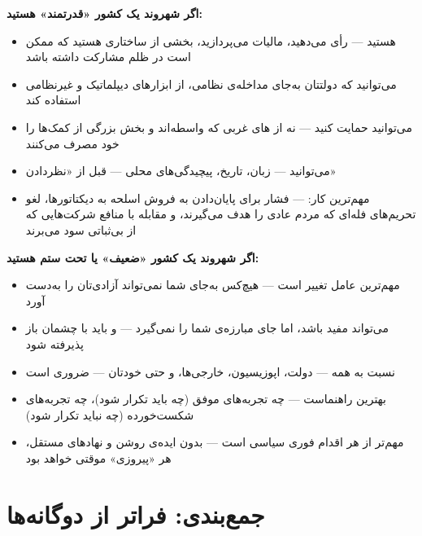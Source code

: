\begin{tcolorbox}[defbox, title={مسئولیت‌های متفاوت، هدف مشترک}]

\textbf{اگر شهروند یک کشور «قدرتمند» هستید:}
\begin{itemize}
\item {} هستید — رأی می‌دهید، مالیات
  می‌پردازید، بخشی از ساختاری هستید که ممکن است در ظلم مشارکت داشته باشد
\item می‌توانید  که دولتتان به‌جای مداخله‌ی نظامی،
  از ابزارهای دیپلماتیک و غیرنظامی استفاده کند
\item می‌توانید  حمایت کنید — نه از
  های غربی که واسطه‌اند و بخش بزرگی از کمک‌ها را خود مصرف
  می‌کنند
\item می‌توانید  — زبان، تاریخ، پیچیدگی‌های محلی —
  قبل از «نظردادن»
\item مهم‌ترین کار:  — فشار برای پایان‌دادن
  به فروش اسلحه به دیکتاتورها، لغو تحریم‌های فله‌ای که مردم عادی را
  هدف می‌گیرند، و مقابله با منافع شرکت‌هایی که از بی‌ثباتی سود می‌برند
\end{itemize}

\tcblower

\textbf{اگر شهروند یک کشور «ضعیف» یا تحت ستم هستید:}
\begin{itemize}
\item {} مهم‌ترین عامل تغییر است — هیچ‌کس به‌جای شما
  نمی‌تواند آزادی‌تان را به‌دست آورد
\item {} می‌تواند مفید باشد، اما جای مبارزه‌ی شما را
  نمی‌گیرد — و باید با چشمان باز پذیرفته شود
\item {} نسبت به همه — دولت، اپوزیسیون، خارجی‌ها،
  و حتی خودتان — ضروری است
\item {} بهترین راهنماست — چه تجربه‌های موفق (چه
  باید تکرار شود)، چه تجربه‌های شکست‌خورده (چه نباید تکرار شود)
\item {} مهم‌تر از هر اقدام فوری سیاسی است
  — بدون ایده‌ی روشن و نهادهای مستقل، هر «پیروزی» موقتی خواهد بود
\end{itemize}
\end{tcolorbox}


\section{جمع‌بندی: فراتر از دوگانه‌ها}
\label{sec:ch17-conclusion}

